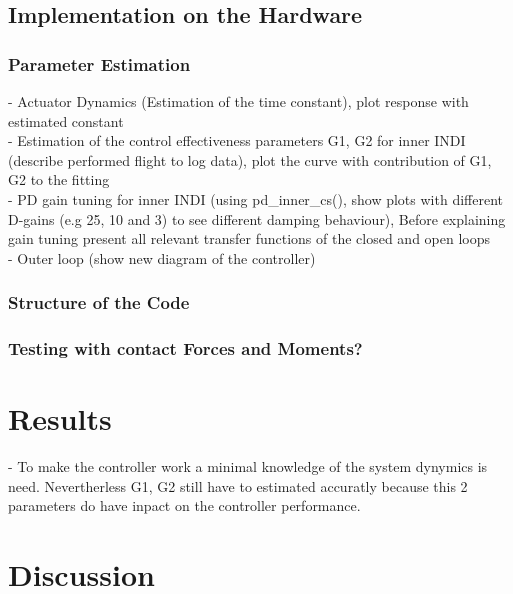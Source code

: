 \documentclass[11pt, a4paper, twoside]{report}
\begin{document}
\section{Implementation on the Hardware} \label{sec:implementation_on_hardware}

\subsection{Parameter Estimation} \label{subsec:parameter_estimation}

- Actuator Dynamics (Estimation of the time constant), plot response with estimated constant\\
- Estimation of the control effectiveness parameters G1, G2 for inner INDI (describe performed flight to log data), plot the curve with contribution of G1, G2 to the fitting\\
- PD gain tuning for inner INDI (using pd\_inner\_cs(), show plots with different D-gains (e.g 25, 10 and 3) to see different damping behaviour), Before explaining gain tuning present all relevant transfer functions of the closed and open loops\\
- Outer loop (show new diagram of the controller)

\subsection{Structure of the Code} \label{subsec:structure_ofthe_code}

\subsection{Testing with contact Forces and Moments?} \label{subsec:testing_with_fandm}

\chapter{Results} \label{cha:results}

\thispagestyle{fancy}

- To make the controller work a minimal knowledge of the system dynymics is need. Nevertherless G1, G2 still have to estimated accuratly because this 2 parameters do have inpact on the controller performance. 


\chapter{Discussion} \label{cha:discussion}
\end{document}

